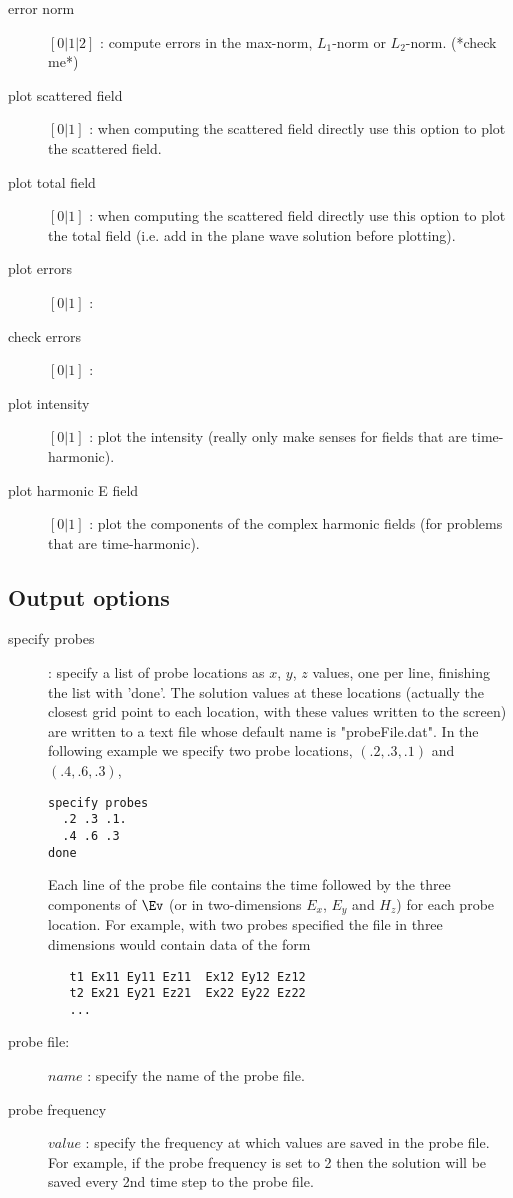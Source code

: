 \documentclass{article}
\begin{document}
\begin{description}
  \item [\qquad error norm] $[0|1|2]$ : compute errors in the max-norm, $L_1$-norm or $L_2$-norm. (*check me*)
  \item [\qquad plot scattered field] $[0|1]$ : when computing the scattered field directly use this option to plot the scattered field.
  \item [\qquad plot total field] $[0|1]$ : when computing the scattered field directly use this option to plot the total field (i.e. add in the
            plane wave solution before plotting).
  \item [\qquad plot errors] $[0|1]$ :
  \item [\qquad check errors] $[0|1]$ :
  \item [\qquad plot intensity] $[0|1]$ : plot the intensity (really only make senses for fields that are time-harmonic). 
  \item [\qquad plot harmonic E field] $[0|1]$ : plot the components of the complex harmonic fields (for problems that are time-harmonic).
\end{description}

\subsection{Output options}

\begin{description}
  \item [\qquad specify probes] : specify a list of probe locations as $x$, $y$, $z$ values, one per line, finishing the
         list with 'done'. The solution values at these locations (actually the closest grid point to each location, with these
         values written to the screen) are
    written to a text file whose default name is "probeFile.dat". 
    In the following example we specify two probe locations, $(.2,.3,.1)$ and $(.4,.6,.3)$, 
\begin{verbatim}
specify probes
  .2 .3 .1.
  .4 .6 .3
done
\end{verbatim}
    Each line of the probe file contains the time followed
    by the three components of $\Ev$ (or in two-dimensions $E_x$, $E_y$ and $H_z$) for each probe location. For example,
    with two probes specified the file in three dimensions would contain data of the form 
\begin{verbatim}
   t1 Ex11 Ey11 Ez11  Ex12 Ey12 Ez12 
   t2 Ex21 Ey21 Ez21  Ex22 Ey22 Ez22 
   ...
\end{verbatim}
  \item [\qquad probe file:] $name$ : specify the name of the probe file.
  \item [\qquad probe frequency] $value$ : specify the frequency at which values are saved in the probe file. For example,
      if the probe frequency is set to 2 then the solution will be saved every 2nd time step to the probe file. 
\end{description}
\end{document}
